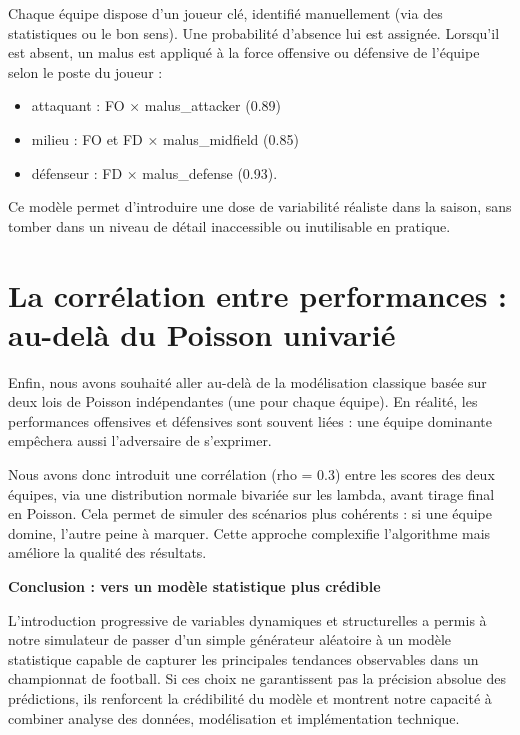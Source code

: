 \documentclass[12pt]{report}
\begin{document}
Chaque équipe dispose d’un joueur clé, identifié manuellement (via des statistiques ou le bon sens). Une probabilité d’absence lui est assignée. Lorsqu’il est absent, un malus est appliqué à la force offensive ou défensive de l’équipe selon le poste du joueur :\\

\begin{itemize}
  \item attaquant : FO × malus\_attacker (0.89)
  \item milieu : FO et FD × malus\_midfield (0.85)
  \item défenseur : FD × malus\_defense (0.93).\\
\end{itemize}

Ce modèle permet d’introduire une dose de variabilité réaliste dans la saison, sans tomber dans un niveau de détail inaccessible ou inutilisable en pratique.

\section{La corrélation entre performances : au-delà du Poisson univarié}

Enfin, nous avons souhaité aller au-delà de la modélisation classique basée sur deux lois de Poisson indépendantes (une pour chaque équipe). En réalité, les performances offensives et défensives sont souvent liées : une équipe dominante empêchera aussi l’adversaire de s’exprimer.

Nous avons donc introduit une corrélation (rho = 0.3) entre les scores des deux équipes, via une distribution normale bivariée sur les lambda, avant tirage final en Poisson. Cela permet de simuler des scénarios plus cohérents : si une équipe domine, l’autre peine à marquer. Cette approche complexifie l’algorithme mais améliore la qualité des résultats.

\textbf{Conclusion : vers un modèle statistique plus crédible}

L’introduction progressive de variables dynamiques et structurelles a permis à notre simulateur de passer d’un simple générateur aléatoire à un modèle statistique capable de capturer les principales tendances observables dans un championnat de football. Si ces choix ne garantissent pas la précision absolue des prédictions, ils renforcent la crédibilité du modèle et montrent notre capacité à combiner analyse des données, modélisation et implémentation technique.
\end{document}
